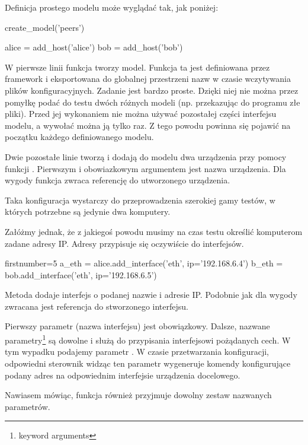 \documentclass[00-praca-magisterska.tex]{subfiles}
\begin{document}
Definicja prostego modelu może wyglądać tak, jak poniżej:

\begin{pythoncode}
  create_model('peers')

  alice = add_host('alice')
  bob   = add_host('bob')
\end{pythoncode}

W pierwsze linii funkcja  tworzy model. Funkcja ta jest
definiowana przez framework i eksportowana do globalnej przestrzeni nazw w
czasie wczytywania plików konfiguracyjnych. Zadanie  jest
bardzo proste. Dzięki niej nie można przez pomyłkę podać do testu dwóch
różnych modeli (np. przekazując do programu złe pliki). Przed jej wykonaniem
nie można używać pozostałej części interfejsu modelu, a wywołać można ją tylko
raz. Z tego powodu powinna się pojawić na początku każdego definiowanego
modelu.

Dwie pozostałe linie tworzą i dodają do modelu dwa urządzenia przy pomocy
funkcji . Pierwszym i obowiazkowym argumentem jest nazwa
urządzenia. Dla wygody funkcja zwraca referencję do utworzonego urządzenia.

Taka konfiguracja wystarczy do przeprowadzenia szerokiej gamy testów, w
których potrzebne są jedynie dwa komputery.

Załóżmy jednak, że z jakiegoś powodu musimy na czas testu określić komputerom
zadane adresy IP. Adresy przypisuje się oczywiście do interfejsów.

\begin{pythoncode*}{firstnumber=5}
  a_eth = alice.add_interface('eth', ip='192.168.6.4')
  b_eth = bob.add_interface('eth', ip='192.168.6.5')
\end{pythoncode*}

Metoda  dodaje interfejs o podanej nazwie i adresie IP.
Podobnie jak  dla wygody zwracana jest referencja do
stworzonego interfejsu.

Pierwszy parametr (nazwa interfejsu) jest obowiązkowy. Dalsze, nazwane
parametry\footnote{keyword arguments} są dowolne i służą do przypisania
interfejsowi pożądanych cech.  W tym wypadku podajemy parametr . W
czasie przetwarzania konfiguracji, odpowiedni sterownik widząc ten parametr
wygeneruje komendy konfigurujące podany adres na odpowiednim interfejsie
urządzenia docelowego.

Nawiasem mówiąc, funkcja  również przyjmuje dowolny zestaw
nazwanych parametrów.
\end{document}

